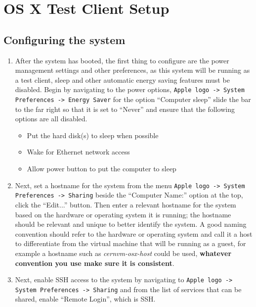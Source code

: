 \section{OS X Test Client Setup}
\subsection{Configuring the system}
\label{sec:osxconfig}

\begin{enumerate}
\item	After the system has booted, the first thing to configure are the power management settings and other preferences, as this system
		will be running as a test client, sleep and other automatic energy saving features must be disabled. Begin by navigating to the
		power options, \verb|Apple logo -> System Preferences -> Energy Saver| for the option ``Computer sleep'' slide the bar to the
		far right so that it is set to ``Never'' and ensure that the following options are all disabled.
\begin{itemize}
\item	Put the hard disk(s) to sleep when possible

\item	Wake for Ethernet network access

\item 	Allow power button to put the computer to sleep
\end{itemize}

\item	Next, set a hostname for the system from the menu \verb|Apple logo -> System Preferences -> Sharing| beside the ``Computer Name:''
		option at the top, click the ``Edit...'' button. Then enter a relevant hostname for the system based on the hardware or operating
		system it is running; the hostname should be relevant and unique to better identify the system. A good naming convention should 
		refer to the hardware or operating system and call it a host to differentiate from the virtual machine that will be running as 
		a guest, for example a hostname such as \emph{cernvm-osx-host} could be used, {\bf whatever convention you use make sure it is 
		consistent}.

\item	Next, enable SSH access to the system by navigating to \verb|Apple logo -> System Preferences -> Sharing| and from the list of 
		services that can be shared, enable ``Remote Login'', which is SSH.
		

\end{enumerate}
